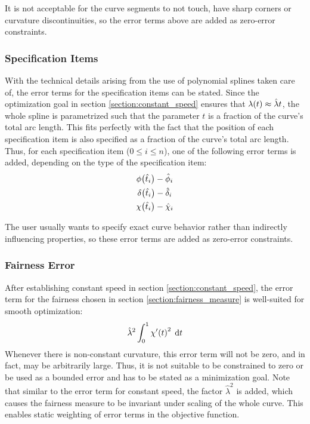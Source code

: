 \documentclass[a4paper]{article}
\begin{document}
				It is not acceptable for the curve segments to not touch, have sharp corners or curvature discontinuities, so the error terms above are added as zero-error constraints.

			\subsubsection{Specification Items}
			\label{section:specification_items}

				With the technical details arising from the use of polynomial splines taken care of, the error terms for the specification items can be stated. Since the optimization goal in section \ref{section:constant_speed} ensures that \(\lambda\!\left( t \right) \approx \hat{\lambda}t\), the whole spline is parametrized such that the parameter \(t\) is a fraction of the curve's total arc length. This fits perfectly with the fact that the position of each specification item is also specified as a fraction of the curve's total arc length. Thus, for each specification item (\(0 \leq i \leq n\)), one of the following error terms is added, depending on the type of the specification item:
				\begin{equation*}
					\begin{gathered}
						\phi\!\left( \hat{t}_i \right) - \hat{\phi}_i\\
						\delta\!\left( \hat{t}_i \right) - \hat{\delta}_i\\
						\chi\!\left( \hat{t}_i \right) - \hat{\chi}_i
					\end{gathered}
				\end{equation*}

				The user usually wants to specify exact curve behavior rather than indirectly influencing properties, so these error terms are added as zero-error constraints.

			\subsubsection{Fairness Error}
			\label{section:fairness_error}

				After establishing constant speed in section \ref{section:constant_speed}, the error term for the fairness chosen in section \ref{section:fairness_measure} is well-suited for smooth optimization:
				\begin{equation*}
					\hat{\lambda}^2\int_{0}^{1} \chi'\!\left( t \right)^2 \; \mathrm{d}t
				\end{equation*}
				Whenever there is non-constant curvature, this error term will not be zero, and in fact, may be arbitrarily large. Thus, it is not suitable to be constrained to zero or be used as a bounded error and has to be stated as a minimization goal. Note that similar to the error term for constant speed, the factor \(\hat{\lambda}^2\) is added, which causes the fairness measure to be invariant under scaling of the whole curve. This enables static weighting of error terms in the objective function.
\end{document}

